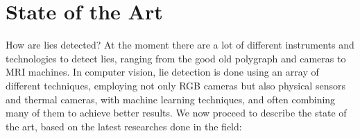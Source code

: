 
\pagebreak

\section{State of the Art} \label{sota}
How are lies detected? At the moment there are a lot of different instruments and technologies to detect lies, ranging from the good old polygraph and cameras to MRI machines. 
In computer vision, lie detection is done using an array of different techniques, employing not only RGB cameras but also physical sensors and thermal cameras, with machine learning techniques, and often combining many of them to achieve better results. 
We now proceed to describe the state of the art, based on the latest researches done in the field:

